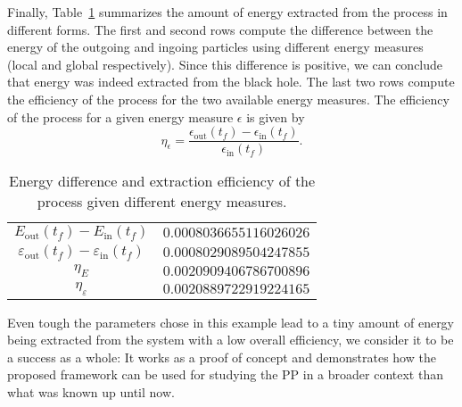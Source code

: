 Finally, Table~\ref{tab:arbitrary_penrose_kerr_example_efficiency} summarizes the amount of energy extracted from the process in different forms. The first and second rows compute the difference between the energy of the outgoing and ingoing particles using different energy measures (local and global respectively). Since this difference is positive, we can conclude that energy was indeed extracted from the black hole. The last two rows compute the efficiency of the process for the two available energy measures. The efficiency of the process for a given energy measure $\epsilon$ is given by
%
\begin{equation}
  \eta_\epsilon = \frac{\epsilon_\text{out}(t_f) - \epsilon_\text{in}(t_f)}{\epsilon_\text{in}(t_f)}.
  \label{eq:arbitrary_penrose_kerr_example_efficiency_formula}
\end{equation}

\begin{table}[]
  \centering
  \begin{tabular}{cc}
    \hline\hline
    $E_\text{out}(t_f)-E_\text{in}(t_f)$                     & $0.0008036655116026026$ \\
    $\varepsilon_\text{out}(t_f)-\varepsilon_\text{in}(t_f)$ & $0.0008029089504247855$ \\
    $\eta_E$                                                 & $0.0020909406786700896$ \\
    $\eta_\varepsilon$                                       & $0.0020889722919224165$ \\ \hline\hline
  \end{tabular}
  \caption{Energy difference and extraction efficiency of the process given different energy measures.}
  \label{tab:arbitrary_penrose_kerr_example_efficiency}
\end{table}

Even tough the parameters chose in this example lead to a tiny amount of energy being extracted from the system with a low overall efficiency, we consider it to be a success as a whole: It works as a proof of concept and demonstrates how the proposed framework can be used for studying the PP in a broader context than what was known up until now.